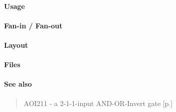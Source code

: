 \paragraph{Usage}

\paragraph{Fan-in / Fan-out}

\paragraph{Layout}

\paragraph{Files}

\paragraph{See also}
\begin{quote}
    AOI211 - a 2-1-1-input AND-OR-Invert gate [p.\pageref{AOI211}]
\end{quote}
